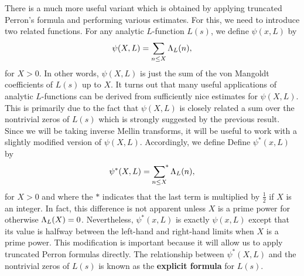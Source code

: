     There is a much more useful variant which is obtained by applying truncated Perron's formula and performing various estimates. For this, we need to introduce two related functions. For any analytic \(L\)-function \(L(s)\), we define \(\psi(x,L)\) by
    \[
      \psi(X,L) = \sum_{n \le X}\Lambda_{L}(n),
    \]
    for \(X > 0\). In other words, \(\psi(X,L)\) is just the sum of the von Mangoldt coefficients of \(L(s)\) up to \(X\). It turns out that many useful applications of analytic \(L\)-functions can be derived from sufficiently nice estimates for \(\psi(X,L)\). This is primarily due to the fact that \(\psi(X,L)\) is closely related a sum over the nontrivial zeros of \(L(s)\) which is strongly suggested by the previous result. Since we will be taking inverse Mellin transforms, it will be useful to work with a slightly modified version of \(\psi(X,L)\). Accordingly, we define Define \(\psi^{\ast}(x,L)\) by
    \[
      \psi^{\ast}(X,L) = \sideset{}{^{\ast}}\sum_{n \le X}\Lambda_{L}(n),
    \]
    for \(X > 0\) and where the \(\ast\) indicates that the last term is multiplied by \(\frac{1}{2}\) if \(X\) is an integer. In fact, this difference is not apparent unless \(X\) is a prime power for otherwise \(\Lambda_{L}(X) = 0\). Nevertheless, \(\psi^{\ast}(x,L)\) is exactly \(\psi(x,L)\) except that its value is halfway between the left-hand and right-hand limits when \(X\) is a prime power. This modification is important because it will allow us to apply truncated Perron formulas directly. The relationship between \(\psi^{\ast}(X,L)\) and the nontrivial zeros of \(L(s)\) is known as the \textbf{explicit formula} for \(L(s)\).

